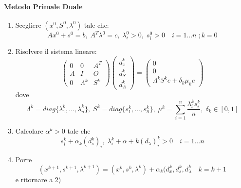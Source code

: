 \paragraph{Metodo Primale Duale}
\begin{center}
\fbox
{
 \begin{minipage}[position]{0.85\textwidth}
\begin{enumerate}
\item Scegliere $(x^{0}, S^{0}, \lambda^{0})$ tale che:
   $$ Ax^{0} + s^{0} = b, \; A^{T} \lambda^{0} = c, \;
  \lambda_i^{0}>0, \; s_i^{0}>0 \quad i = 1\ldots n \; ; k=0 $$
\item Risolvere il sistema lineare:
$$
\begin{pmatrix}
 0 & 0 & A^{T} \\
 A & I & O  \\
 0 & \Lambda^{k} & S^{k}
\end{pmatrix}
\begin{pmatrix}
 d_{x}^{k} \\
 d_{S}^{k} \\
 d_{\Lambda}^{k}
\end{pmatrix}
=
\begin{pmatrix}
0 \\
 0 \\
 \Lambda^{k} S^{k} e + \delta_k \mu_k e 
\end{pmatrix}
$$
dove
$$\Lambda^{k} = diag\{ \lambda_1^{k}, \ldots, \lambda_n^{k}\}, \;
S^{k} = diag\{ s_1^{k}, \ldots, s_n^{k}\}, \;
\mu^{k} = \displaystyle \sum_{i=1}^{n} \dfrac{\lambda_i^{k}s_i^{k}}{n}, \;
\delta_k \in [0,1]
$$
\item  Calcolare $\alpha^{k} > 0$ tale che
$$ s_i^{k} + \alpha_k(d_s^{k})_i, \; \lambda_i^{k} + \alpha+k(d_{\lambda})_i^{k}>0
\quad i=1 \ldots n$$
\item Porre $$(x^{k+1}, s^{k+1}, \lambda^{k+1}) = 
  (x^{k}, s^{k}, \lambda^{k}) + \alpha_k(d_x^{k}, d_s^{k}, d_{\lambda}^{k}
\quad k=k+1
$$
e ritornare a 2)
\end{enumerate}
\end{minipage}
}
\end{center}

\outbpdocument


